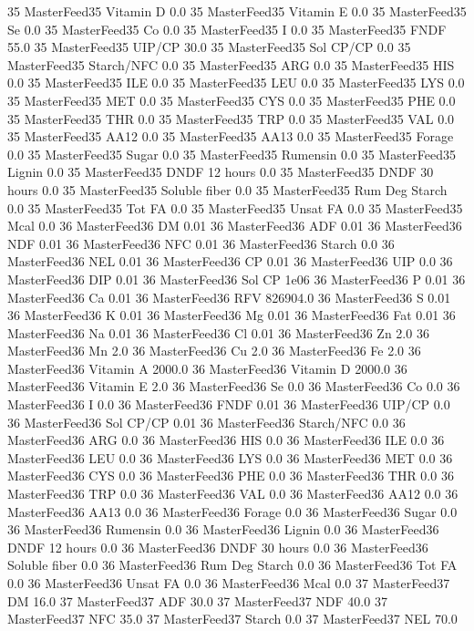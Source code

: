 \documentclass[letterpaper,10pt,english]{sphinxmanual}
\begin{document}
\begin{sphinxVerbatim}[commandchars=\\\{\},numbers=left,firstnumber=1,stepnumber=1]
35 MasterFeed35 Vitamin D 0.0
35 MasterFeed35 Vitamin E 0.0
35 MasterFeed35 Se 0.0
35 MasterFeed35 Co 0.0
35 MasterFeed35 I 0.0
35 MasterFeed35 FNDF 55.0
35 MasterFeed35 UIP/CP 30.0
35 MasterFeed35 Sol CP/CP 0.0
35 MasterFeed35 Starch/NFC 0.0
35 MasterFeed35 ARG 0.0
35 MasterFeed35 HIS 0.0
35 MasterFeed35 ILE 0.0
35 MasterFeed35 LEU 0.0
35 MasterFeed35 LYS 0.0
35 MasterFeed35 MET 0.0
35 MasterFeed35 CYS 0.0
35 MasterFeed35 PHE 0.0
35 MasterFeed35 THR 0.0
35 MasterFeed35 TRP 0.0
35 MasterFeed35 VAL 0.0
35 MasterFeed35 AA\PYGZsh{}12 0.0
35 MasterFeed35 AA\PYGZsh{}13 0.0
35 MasterFeed35 \PYGZpc{} Forage 0.0
35 MasterFeed35 Sugar \PYGZpc{} 0.0
35 MasterFeed35 Rumensin 0.0
35 MasterFeed35 Lignin 0.0
35 MasterFeed35 DNDF 12 hours 0.0
35 MasterFeed35 DNDF 30 hours 0.0
35 MasterFeed35 Soluble fiber 0.0
35 MasterFeed35 Rum Deg Starch 0.0
35 MasterFeed35 Tot FA 0.0
35 MasterFeed35 Unsat FA 0.0
35 MasterFeed35 Mcal 0.0
36 MasterFeed36 DM 0.01
36 MasterFeed36 ADF 0.01
36 MasterFeed36 NDF 0.01
36 MasterFeed36 NFC 0.01
36 MasterFeed36 Starch 0.0
36 MasterFeed36 NEL 0.01
36 MasterFeed36 CP 0.01
36 MasterFeed36 UIP 0.0
36 MasterFeed36 DIP 0.01
36 MasterFeed36 Sol CP 1e\PYGZhy{}06
36 MasterFeed36 P 0.01
36 MasterFeed36 Ca 0.01
36 MasterFeed36 RFV 826904.0
36 MasterFeed36 S 0.01
36 MasterFeed36 K 0.01
36 MasterFeed36 Mg 0.01
36 MasterFeed36 Fat 0.01
36 MasterFeed36 Na 0.01
36 MasterFeed36 Cl 0.01
36 MasterFeed36 Zn 2.0
36 MasterFeed36 Mn 2.0
36 MasterFeed36 Cu 2.0
36 MasterFeed36 Fe 2.0
36 MasterFeed36 Vitamin A 2000.0
36 MasterFeed36 Vitamin D 2000.0
36 MasterFeed36 Vitamin E 2.0
36 MasterFeed36 Se 0.0
36 MasterFeed36 Co 0.0
36 MasterFeed36 I 0.0
36 MasterFeed36 FNDF 0.01
36 MasterFeed36 UIP/CP 0.0
36 MasterFeed36 Sol CP/CP 0.01
36 MasterFeed36 Starch/NFC 0.0
36 MasterFeed36 ARG 0.0
36 MasterFeed36 HIS 0.0
36 MasterFeed36 ILE 0.0
36 MasterFeed36 LEU 0.0
36 MasterFeed36 LYS 0.0
36 MasterFeed36 MET 0.0
36 MasterFeed36 CYS 0.0
36 MasterFeed36 PHE 0.0
36 MasterFeed36 THR 0.0
36 MasterFeed36 TRP 0.0
36 MasterFeed36 VAL 0.0
36 MasterFeed36 AA\PYGZsh{}12 0.0
36 MasterFeed36 AA\PYGZsh{}13 0.0
36 MasterFeed36 \PYGZpc{} Forage 0.0
36 MasterFeed36 Sugar \PYGZpc{} 0.0
36 MasterFeed36 Rumensin 0.0
36 MasterFeed36 Lignin 0.0
36 MasterFeed36 DNDF 12 hours 0.0
36 MasterFeed36 DNDF 30 hours 0.0
36 MasterFeed36 Soluble fiber 0.0
36 MasterFeed36 Rum Deg Starch 0.0
36 MasterFeed36 Tot FA 0.0
36 MasterFeed36 Unsat FA 0.0
36 MasterFeed36 Mcal 0.0
37 MasterFeed37 DM 16.0
37 MasterFeed37 ADF 30.0
37 MasterFeed37 NDF 40.0
37 MasterFeed37 NFC 35.0
37 MasterFeed37 Starch 0.0
37 MasterFeed37 NEL 70.0

\end{sphinxVerbatim}
\end{document}
